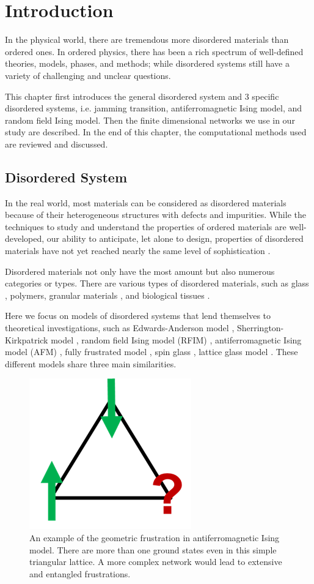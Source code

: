 \chapter{Introduction}
\label{chap-intro}

In the physical world, there are tremendous more disordered materials than ordered ones.
In ordered physics, there has been a rich spectrum of 
well-defined theories, models, phases, and methods; while disordered 
systems still have a variety of challenging and unclear questions. 

This chapter first introduces the general disordered system and 3 specific disordered systems, i.e. jamming transition, antiferromagnetic Ising model, and random field Ising model. Then the finite dimensional networks we use in our study are described. In the end of this chapter, the computational methods used are reviewed and discussed.

\section{Disordered System}
In the real world, most materials can be considered as disordered materials because of their heterogeneous structures with defects and impurities. While the techniques to study and understand the properties of ordered materials are well-developed, our
ability to anticipate, let alone to design, properties of disordered materials have not yet reached nearly the same level of sophistication \cite{Kotani16Material}. 

Disordered materials not only have the most amount but also numerous categories or types. There are various types of disordered materials, such as glass \cite{Gibbs1958nature, berthier2016facets}, polymers\cite{roth2005glass}, granular materials \cite{richard2005slow}, and biological tissues \cite{bi2015density}.

Here we focus on models of disordered systems that lend themselves to theoretical investigations, such as Edwards-Anderson model \cite{edwards1975theory}, Sherrington-Kirkpatrick model \cite{sherrington1975}, random field Ising model (RFIM) \cite{imry1975random}, antiferromagnetic Ising model (AFM) \cite{wannier1950afm},  fully frustrated model \cite{kosterlitz1973ordering, kosterlitz1974critical}, spin glass \cite{young1997spin}, lattice glass model \cite{Biroli02}. These different models share  three main similarities. 
\begin{figure}[h]
\centering \includegraphics[width=0.2\columnwidth]{Chapter-1/geo_frustration.png} 
\protect\caption{\label{fig:intro-gf} An example of the geometric frustration in antiferromagnetic Ising model. There are more than one ground states even in this simple triangular lattice. A more complex network would lead to extensive and entangled frustrations.}
\end{figure}

